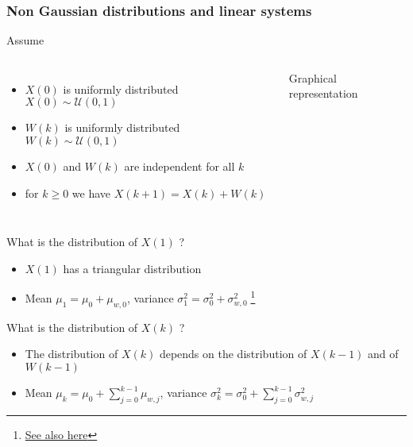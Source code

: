 \begin{frame}
	\frametitle{Non Gaussian distributions and linear systems}
	Assume 
	\begin{columns}
		\begin{itemize}
			\item $X(0)$ is uniformly distributed $X(0)\sim\mathcal{U}(0, 1)$
			\item $W(k)$ is uniformly distributed $W(k)\sim\mathcal{U}(0, 1)$
			\item $X(0)$ and $W(k)$ are independent for all $k$
			\item for $k\geq0$ we have $X(k+1) =X(k) + W(k)$
		\end{itemize}	
		\begin{block}{Graphical representation}
		\end{block}
	\end{columns}
	
	\vspace*{0.5em}
	
	 What is the distribution of $X(1)$ ?
	\begin{itemize}
		\item $X(1)$ has a triangular distribution
		\item Mean $\mu_1=\mu_0+\mu_{w,0}$, variance $\sigma_1^2 = \sigma_0^2 + \sigma_{w,0}^2\;$\footnote{\href{http://eli.thegreenplace.net/2009/01/07/variance-of-the-sum-of-independent-variables}{See also here}}
	\end{itemize}
	
	\vspace*{0.5em}
	 What is the distribution of $X(k)$ ?
	\begin{itemize}
		\item The distribution of $X(k)$ depends on the distribution of $X(k-1)$ and of $W(k-1)$
		\item Mean $\mu_k=\mu_0+\sum_{j=0}^{k-1}\mu_{w,j}$, variance $\sigma_k^2=\sigma_0^2 + \sum_{j=0}^{k-1}\sigma_{w,j}^2$
		
	\end{itemize}
\end{frame}

